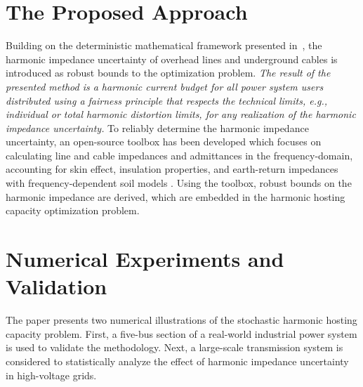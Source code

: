 \documentclass{IEEEtran4PSCC}
\begin{document}
\section{The Proposed Approach}

Building on the deterministic mathematical framework presented in~\cite{tom_van_acker_exact_nodate}, the harmonic impedance uncertainty of overhead lines and underground cables is introduced as robust bounds to the optimization problem. \textit{The result of the presented method is a harmonic current budget for all power system users distributed using a fairness principle that respects the technical limits, e.g., individual or total harmonic distortion limits, for any realization of the harmonic impedance uncertainty.}
To reliably determine the harmonic impedance uncertainty, an open-source toolbox has been developed which focuses on calculating line and cable impedances and admittances in the frequency-domain, accounting for skin effect, insulation properties, and earth-return impedances with frequency-dependent soil models \cite{amauri_g_martins_britto_linecablemodelsjl_nodate}. Using the toolbox, robust bounds on the harmonic impedance are derived, which are embedded in the harmonic hosting capacity optimization problem. 

\section{Numerical Experiments and Validation}
The paper presents two numerical illustrations of the stochastic harmonic hosting capacity problem. First, a five-bus section of a real-world industrial power system is used to validate the methodology. Next, a large-scale transmission system is considered to statistically analyze the effect of harmonic impedance uncertainty in high-voltage grids.



\end{document}
